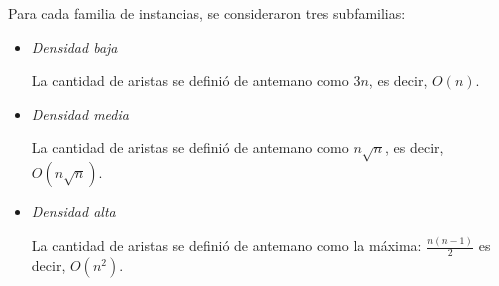 Para cada familia de instancias, se consideraron tres subfamilias:

\begin{itemize}
    \item \textit{Densidad baja}

    La cantidad de aristas se definió de antemano como $3n$, es decir, $O(n)$.
    \item \textit{Densidad media}

    La cantidad de aristas se definió de antemano como $n\sqrt{n}$, es decir, $O(n\sqrt{n})$.
    \item \textit{Densidad alta}

    La cantidad de aristas se definió de antemano como la máxima: $\frac{n(n-1)}{2}$ es decir, $O(n^2)$.
\end{itemize}
